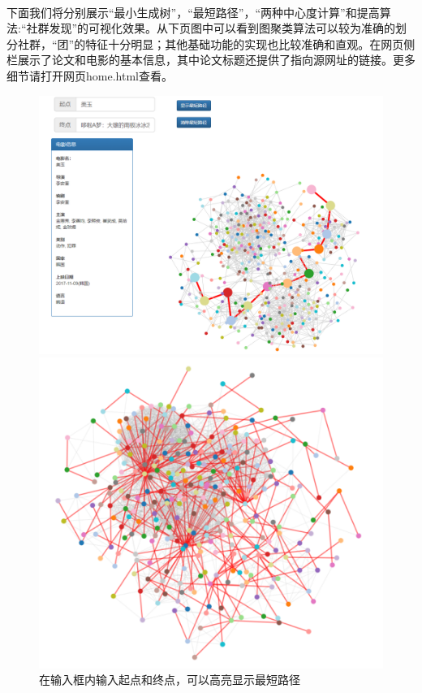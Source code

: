 \documentclass[UTF8, onecolumn, a4paper]{article}
\begin{document}
\paragraph*{}
   下面我们将分别展示“最小生成树”，“最短路径”，“两种中心度计算”和提高算法:“社群发现”的可视化效果。从下页图中可以看到图聚类算法可以较为准确的划分社群，“团”的特征十分明显；其他基础功能的实现也比较准确和直观。在网页侧栏展示了论文和电影的基本信息，其中论文标题还提供了指向源网址的链接。更多细节请打开网页home.html查看。
\begin{center}
	\begin{figure}[ht] %
		\centering %
		\begin{minipage}[b]{\linewidth} %
			\begin{minipage}[b]{0.6\linewidth} %
				\centering
				\includegraphics[width=\linewidth]{../pictures/show1}
				\caption{在输入框内输入起点和终点，可以高亮显示最短路径}
			\end{minipage}
			\hfill
			\begin{minipage}[b]{0.4\linewidth}
				\centering
				\includegraphics[width=\linewidth]{../pictures/show18}

\end{minipage}
\end{minipage}
\end{figure}
\end{center}
\end{document}
